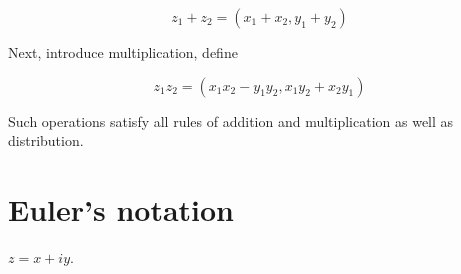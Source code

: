 \documentclass{article}
\newtheorem{one minute paper}[theorem]{One Minute Paper}
\begin{document}
\begin{equation}
    z_1 + z_2 = (x_1 + x_2, y_1 + y_2)
\end{equation}

Next, introduce multiplication, define 

\begin{equation}
    z_1z_2 = (x_1x_2 - y_1y_2, x_1y_2 + x_2y_1)
\end{equation}

Such operations satisfy all rules of addition and multiplication as well as distribution. 

\section*{Euler's notation}

$z = x + iy$. 
\end{document}
